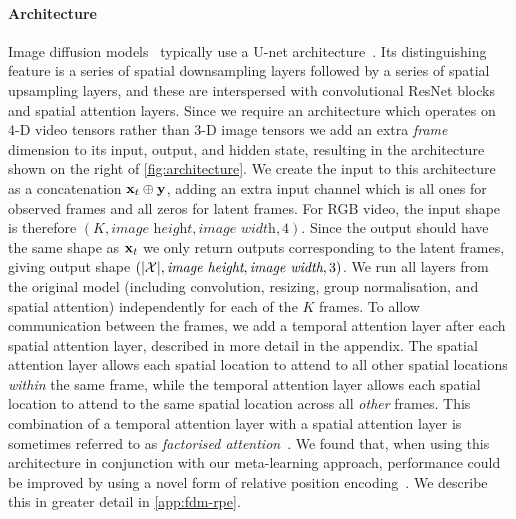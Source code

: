 \paragraph{Architecture}
\label{sec:fdm-architecture}
Image diffusion models~\citep{ho2020denoising,nichol2021improved} typically use a U-net architecture~\cite{ronneberger2015u}. Its distinguishing feature is a series of spatial downsampling layers followed by a series of spatial upsampling layers, and these are interspersed with convolutional ResNet blocks~\cite{he2015deep} and spatial attention layers. Since we require an architecture which operates on 4-D video tensors rather than 3-D image tensors we add an extra \textit{frame} dimension to its input, output, and hidden state, resulting in the architecture shown on the right of \cref{fig:architecture}. We create the input to this architecture as a concatenation ${\mathbf{x}}_t \oplus {\mathbf{y}}$, adding an extra input channel which is all ones for observed frames and all zeros for latent frames. For RGB video, the input shape is therefore $(K, \textit{image height}, \textit{image width}, 4)$. Since the output should have the same shape as ${\mathbf{x}}_t$ we only return outputs corresponding to the latent frames, giving output shape  $(|\mathcal{X}|, \textit{image height}, \textit{image width}, 3)$. We run all layers from the original model (including convolution, resizing, group normalisation, and spatial attention) independently for each of the $K$ frames.
To allow communication between the frames, we add a temporal attention layer after each spatial attention layer, described in more detail in the appendix. 
%
The spatial attention layer allows each spatial location to attend to all other spatial locations \textit{within} the same frame, while the temporal attention layer allows each spatial location to attend to the same spatial location across all \textit{other} frames.
%
This combination of a temporal attention layer with a spatial attention layer is sometimes referred to as \textit{factorised attention}~\citep{tashiro2021csdi,ho2022video}. We found that, when using this architecture in conjunction with our meta-learning approach, performance could be improved by using a novel form of relative position encoding~\cite{shaw2018self,wu2021rethinking}. We describe this in greater detail in \cref{app:fdm-rpe}.


